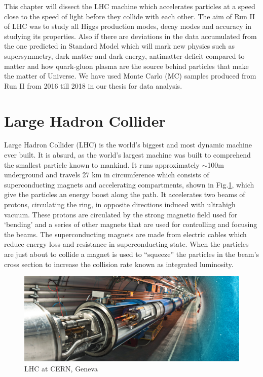 This chapter will dissect the LHC machine which accelerates particles at a speed close to the speed of light before they collide with each other. The aim of Run II of LHC was to study all Higgs production modes, decay modes and accuracy in studying its properties. Also if there are deviations in the data accumulated from the one predicted in Standard Model which will mark new physics such as supersymmetry, dark matter and dark energy, antimatter deficit compared to matter and how quark-gluon plasma are the source behind particles that make the matter of Universe. We have used Monte Carlo (MC) samples produced from Run II from 2016 till 2018 in our thesis for data analysis.\\
\section{Large Hadron Collider}
Large Hadron Collider (LHC) is the world's biggest and most dynamic machine ever built. It is absurd, as the world's largest machine was built to comprehend the smallest particle known to mankind. It runs approximately $\sim$100m underground and travels 27 km in circumference which consists of superconducting magnets and accelerating compartments, shown in Fig.\ref{fig:lhc}, which give the particles an energy boost along the path. It accelerates two beams of protons, circulating the ring, in opposite directions induced with ultrahigh vacuum. These protons are circulated by the strong magnetic field used for ‘bending’ and a series of other magnets that are used for controlling and focusing the beams. The superconducting magnets are made from electric cables which reduce energy loss and resistance in superconducting state. When the particles are just about to collide a magnet is used to ``squeeze'' the particles in the beam's cross section to increase the collision rate known as integrated luminosity.\\
\begin{figure}
    \centering
    \includegraphics[scale=0.26]{images/lhci.png}
    \caption{LHC at CERN, Geneva}
    \label{fig:lhc}
\end{figure}
